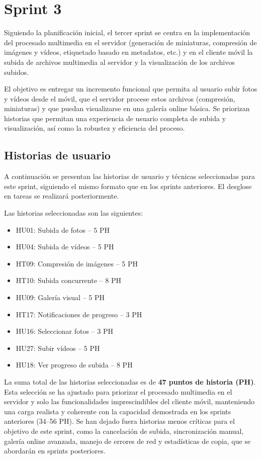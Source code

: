 \newpage
\section{Sprint 3}

Siguiendo la planificación inicial, el tercer sprint se centra en la implementación del procesado multimedia en el servidor (generación de miniaturas, compresión de imágenes y vídeos, etiquetado basado en metadatos, etc.) y en el cliente móvil la subida de archivos multimedia al servidor y la visualización de los archivos subidos.

El objetivo es entregar un incremento funcional que permita al usuario subir fotos y vídeos desde el móvil, que el servidor procese estos archivos (compresión, miniaturas) y que puedan visualizarse en una galería online básica. Se priorizan historias que permitan una experiencia de usuario completa de subida y visualización, así como la robustez y eficiencia del proceso.

\subsection{Historias de usuario}
A continuación se presentan las historias de usuario y técnicas seleccionadas para este sprint, siguiendo el mismo formato que en los sprints anteriores. El desglose en tareas se realizará posteriormente.

Las historias seleccionadas son las siguientes:
\begin{itemize}
    \item HU01: Subida de fotos -- 5 PH
    \item HU04: Subida de vídeos -- 5 PH
    \item HT09: Compresión de imágenes -- 5 PH
    \item HT10: Subida concurrente -- 8 PH
    \item HU09: Galería visual -- 5 PH
    \item HT17: Notificaciones de progreso -- 3 PH
    \item HU16: Seleccionar fotos -- 3 PH
    \item HU27: Subir vídeos -- 5 PH
    \item HU18: Ver progreso de subida -- 8 PH
\end{itemize}

La suma total de las historias seleccionadas es de \textbf{47 puntos de historia (PH)}. Esta selección se ha ajustado para priorizar el procesado multimedia en el servidor y solo las funcionalidades imprescindibles del cliente móvil, manteniendo una carga realista y coherente con la capacidad demostrada en los sprints anteriores (34–56 PH). Se han dejado fuera historias menos críticas para el objetivo de este sprint, como la cancelación de subida, sincronización manual, galería online avanzada, manejo de errores de red y estadísticas de copia, que se abordarán en sprints posteriores.

